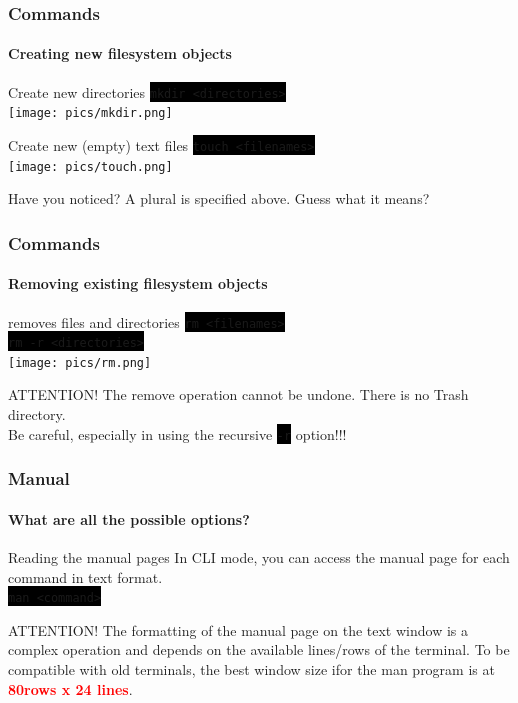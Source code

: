\documentclass[unknownkeysallowed, 10pt, a4 paper, handout]{beamer}
\newcommand{\focus}[1]{\textbf{\textcolor{red}{#1}}}
\newcommand{\code}[1]{\colorbox{black}{\color{green}\texttt{#1}}}
\begin{document}
\begin{frame}[c]
  \frametitle{Commands}
  \framesubtitle{Creating new filesystem objects}

  \begin{exampleblock}{Create new directories}
    \code{mkdir <directories>}\\
    \texttt{[image: pics/mkdir.png]}
  \end{exampleblock}

  \begin{exampleblock}{Create new (empty) text files}
    \code{touch <filenames>}\\
    \texttt{[image: pics/touch.png]}
  \end{exampleblock}

  \begin{alertblock}{Have you noticed?}
    A plural is specified above. Guess what it means?
  \end{alertblock}
\end{frame}

\begin{frame}[c]
  \frametitle{Commands}
  \framesubtitle{Removing existing filesystem objects}

  \begin{exampleblock}{removes files and directories}
    \code{rm <filenames>}\\
    \code{rm -r <directories>} \\
    \texttt{[image: pics/rm.png]}
  \end{exampleblock}

  \begin{alertblock}{ATTENTION!}
    The remove operation cannot be undone. There is no Trash directory.\\
    Be careful, especially in using the recursive \code{-r} option!!!
  \end{alertblock}
\end{frame}


\begin{frame}[c]
  \frametitle{Manual}
  \framesubtitle{What are all the possible options?}

  \begin{exampleblock}{Reading the manual pages}
    In CLI mode, you can access the manual page for each command in text
    format. \\
    \code{man <command>}
  \end{exampleblock}

  \begin{alertblock}{ATTENTION!}
    The formatting of the manual page on the text window is a complex
    operation and depends on the available lines/rows of the terminal.
    To be compatible with old terminals, the best window size ifor the
    man program is at \focus{80rows x 24 lines}. 
  \end{alertblock}
\end{frame}
\end{document}
